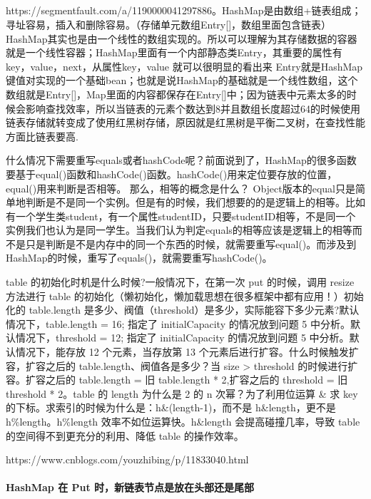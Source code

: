 \documentclass[../../../interview-questions.tex]{subfiles}
\begin{document}
\subsection{\color{red}{HashMap原理}}

https://segmentfault.com/a/1190000041297886。HashMap是由数组+链表组成；寻址容易，插入和删除容易。（存储单元数组Entry[]，数组里面包含链表）HashMap其实也是由一个线性的数组实现的。所以可以理解为其存储数据的容器就是一个线性容器；HashMap里面有一个内部静态类Entry，其重要的属性有key，value，next，从属性key，value 就可以很明显的看出来 Entry就是HashMap键值对实现的一个基础bean；也就是说HashMap的基础就是一个线性数组，这个数组就是Entry[]，Map里面的内容都保存在Entry[]中；因为链表中元素太多的时候会影响查找效率，所以当链表的元素个数达到8并且数组长度超过64的时候使用链表存储就转变成了使用红黑树存储，原因就是红黑树是平衡二叉树，在查找性能方面比链表要高.

什么情况下需要重写equals或者hashCode呢？前面说到了，HashMap的很多函数要基于equal()函数和hashCode()函数。hashCode()用来定位要存放的位置，equal()用来判断是否相等。
那么，相等的概念是什么？
Object版本的equal只是简单地判断是不是同一个实例。但是有的时候，我们想要的的是逻辑上的相等。比如有一个学生类student，有一个属性studentID，只要studentID相等，不是同一个实例我们也认为是同一学生。当我们认为判定equals的相等应该是逻辑上的相等而不是只是判断是不是内存中的同一个东西的时候，就需要重写equal()。而涉及到HashMap的时候，重写了equals()，就需要重写hashCode()。

table 的初始化时机是什么时候?一般情况下，在第一次 put 的时候，调用 resize 方法进行 table 的初始化（懒初始化，懒加载思想在很多框架中都有应用！）初始化的 table.length 是多少、阀值（threshold）是多少，实际能容下多少元素?默认情况下，table.length = 16; 指定了 initialCapacity 的情况放到问题 5 中分析。默认情况下，threshold = 12; 指定了 initialCapacity 的情况放到问题 5 中分析。默认情况下，能存放 12 个元素，当存放第 13 个元素后进行扩容。什么时候触发扩容，扩容之后的 table.length、阀值各是多少？当 size > threshold 的时候进行扩容。扩容之后的 table.length = 旧 table.length * 2,扩容之后的 threshold = 旧 threshold * 2。table 的 length 为什么是 2 的 n 次幂？为了利用位运算 \& 求 key 的下标。求索引的时候为什么是：h\&(length-1)，而不是 h\&length，更不是 h\%length。h\%length 效率不如位运算快。h\&length 会提高碰撞几率，导致 table 的空间得不到更充分的利用、降低 table 的操作效率。

https://www.cnblogs.com/youzhibing/p/11833040.html

\paragraph{HashMap 在 Put 时，新链表节点是放在头部还是尾部}
\end{document}
